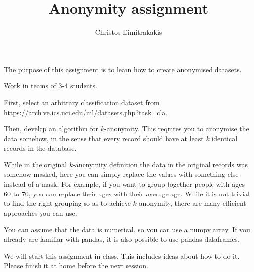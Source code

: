 \documentclass[a4paper]{article}
\title{Anonymity assignment}
\author{Christos Dimitrakakis}
\begin{document}
\maketitle
The purpose of this assignment is to learn how to create anonymised datasets.

\begin{exercise}
  Work in teams of 3-4 students.


  First, select an arbitrary classification dataset from \url{https://archive.ics.uci.edu/ml/datasets.php?task=cla}. 

  Then, develop an algorithm for $k$-anonymity. This requires you to
  anonymise the data somehow, in the sense that every record should
  have at least $k$ identical records in the database.

  While in the original $k$-anonymity definition the data in the
  original records was somehow masked, here you can simply replace the
  values with something else instead of a mask. For example, if you
  want to group together people with ages 60 to 70, you can replace
  their ages with their average age. While it is not trivial to find
  the right grouping so as to achieve $k$-anonymity, there are many
  efficient approaches you can use. 

  You can assume that the data is numerical, so you can use a numpy
  array. If you already are familiar with pandas, it is also possible
  to use pandas dataframes.

  We will start this assignment in-class. This includes ideas about
  how to do it. Please finish it at home before the next session.
  
\end{exercise}
\end{document}
